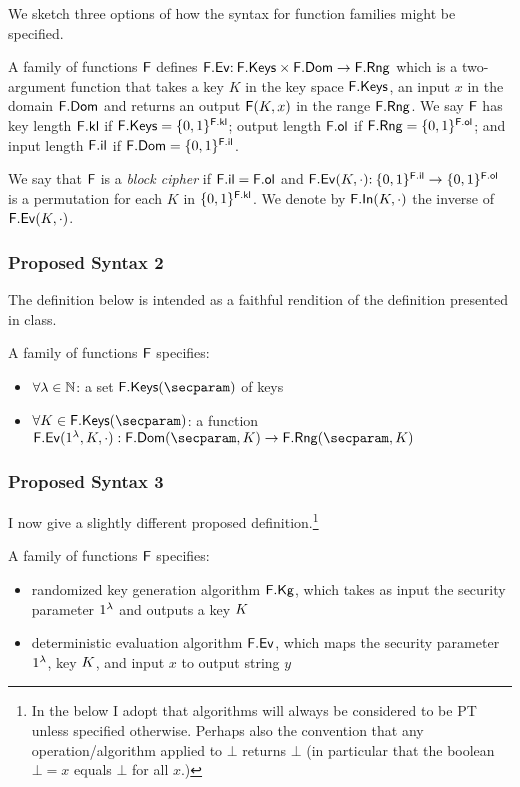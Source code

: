 
We sketch three options of how the syntax for function families might be specified.

A family of functions $\mathsf{F}$ defines $\mathsf{F}.\mathsf{Ev} {:\:} \mathsf{F}.\mathsf{Keys} \times \mathsf{F}.\mathsf{Dom}\to \mathsf{F}.\mathsf{Rng}$ which is a two-argument function that takes a key $K$ in the key space $\mathsf{F}.\mathsf{Keys}$, an input $x$ in the domain $\mathsf{F}.\mathsf{Dom}$ and returns an output $\mathsf{F}(K,x)$ in the range $\mathsf{F}.\mathsf{Rng}$. We say $\mathsf{F}$ has key length $\mathsf{F}.\mathsf{kl}$ if
$\mathsf{F}.\mathsf{Keys}=\{0,1\}^{\mathsf{F}.\mathsf{kl}}$; output length $\mathsf{F}.\mathsf{ol}$ if $\mathsf{F}.\mathsf{Rng}=\{0,1\}^{\mathsf{F}.\mathsf{ol}}$; and input length $\mathsf{F}.\mathsf{il}$ if $\mathsf{F}.\mathsf{Dom}=\{0,1\}^{\mathsf{F}.\mathsf{il}}$.

We say that $\mathsf{F}$ is a \emph{block cipher} if $\mathsf{F}.\mathsf{il}=\mathsf{F}.\mathsf{ol}$ and $\mathsf{F}.\mathsf{Ev}(K,\cdot) {:\:} \{0,1\}^{\mathsf{F}.\mathsf{il}}\to\{0,1\}^{\mathsf{F}.\mathsf{ol}}$ is a permutation for each $K$ in $\{0,1\}^{\mathsf{F}.\mathsf{kl}}$. We denote by $\mathsf{F}.\mathsf{In}(K,\cdot)$ the inverse of $\mathsf{F}.\mathsf{Ev}(K,\cdot)$.

\subsubsection{Proposed Syntax 2}

The definition below is intended as a faithful rendition of the definition presented in class.

\begin{defn}
	A family of functions $\mathsf{F}$ specifies:
	\begin{itemize}
		\item $\forall \lambda\in{{\mathbb N}}$: a set $\Keys{\FF}(\secparam)$ of keys
		\item $\forall \key\in\Keys{\FF}(\secparam)$: a function $\Ev{\FF}(\secIn,\key,\cdot):\Dom{\FF}(\secparam,\key)\to\Rng{\FF}(\secparam,\key)$
	\end{itemize}
\end{defn}

\subsubsection{Proposed Syntax 3}

I now give a slightly different proposed definition.\footnote{In the below I adopt that algorithms will always be considered to be PT unless specified otherwise.
Perhaps also the convention that any operation/algorithm applied to $\bot$ returns $\bot$ (in particular that the boolean $\bot=x$ equals $\bot$ for all $x$.)}

\begin{defn}
	A family of functions $\mathsf{F}$ specifies:
	\begin{itemize}
		\item randomized key generation algorithm $\mathsf{F}.\mathsf{Kg}$, which takes as input the security parameter $1^\lambda$ and outputs a key $K$
		\item deterministic evaluation algorithm $\mathsf{F}.\mathsf{Ev}$,  which maps the security parameter $1^\lambda$,  key $K$, and input $x$ to output string $y$ 
	\end{itemize}
\end{defn}

